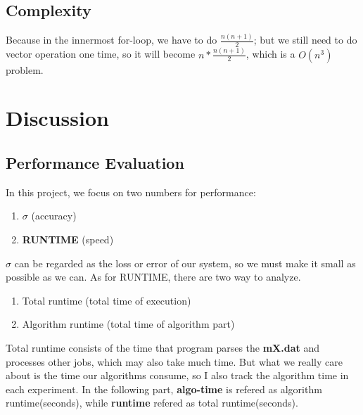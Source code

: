 \documentclass{article}
\begin{document}
\subsection{Complexity}
\label{sec:complexity}
Because in the innermost for-loop, we have to do $\frac{n(n+1)}{2}$; but we still need to do vector operation one time, so it will
become $n * \frac{n(n+1)}{2}$, which is a {\boldmath$O(n^3)$} problem.

\section{Discussion}
\subsection{Performance Evaluation}
In this project, we focus on two numbers for performance:
\begin{enumerate}
    \item {\boldmath$\sigma$} (accuracy) \\
    \item \textbf{RUNTIME} (speed)
\end{enumerate}

$\sigma$ can be regarded as the loss or error of our system, so we must make it small as possible as we can. As for RUNTIME, there are
two way to analyze.
\begin{enumerate}
    \item Total runtime (total time of execution) \\
    \item Algorithm runtime (total time of algorithm part)
\end{enumerate}
Total runtime consists of the time that program parses the \textbf{mX.dat} and processes other jobs, which may also take much time.
But what we really care about is the time our algorithms consume, so I also track the algorithm time in each 
experiment. In the following part, \textbf{algo-time} is refered as algorithm runtime(seconds), 
while \textbf{runtime} refered as total runtime(seconds).
\end{document}
